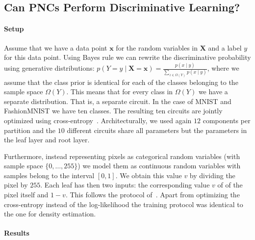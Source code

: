 \documentclass[letterpaper]{article} %
\newcommand{\Xvars}{\ensuremath{\mathbf{X}}}
\newcommand{\xvars}{\ensuremath{\mathbf{x}}}
\begin{document}
\subsection{Can PNCs Perform Discriminative Learning?}
\paragraph*{Setup}
Assume that we have a data point $\xvars$ for the random variables in $\Xvars$ and a label $y$ for this data point. Using Bayes rule we can rewrite the discriminative probability using generative distributions:
$
    p(Y{=}y{\mid} \Xvars{=}\xvars )
    {=}
    \frac{
        p(x{\mid} y)
    }
    {
        \sum_{z\in \Omega(Y)} p(x{\mid} y)
    }
$,
where we assume that the class prior is identical for each of the classes belonging to the sample space $\Omega(Y)$. This means that for every class in $\Omega(Y)$ we have a separate distribution. That is, a separate circuit. In the case of MNIST and FashionMNIST we have ten classes. The resulting ten circuits are jointly optimized using cross-entropy~\citep{peharz2019random}.
Architecturally, we used again $12$ components per partition and the $10$ different circuits share all parameters but the parameters in the leaf layer and root layer.

Furthermore, instead representing pixels as categorical random variables (with sample space $\{0,\dots, 255 \}$) we model them as continuous random variables with samples belong to the interval $[0,1]$. We obtain this value $v$ by dividing the pixel by $255$. Each leaf has then two inputs: the corresponding value $v$ of of the pixel itself and $1-v$.
This follows the protocol of~\citep[]{liang2019learning}.
Apart from optimizing the cross-entropy instead of the log-likelihood the training protocol was identical to the one for density estimation.



\paragraph*{Results}
\end{document}
